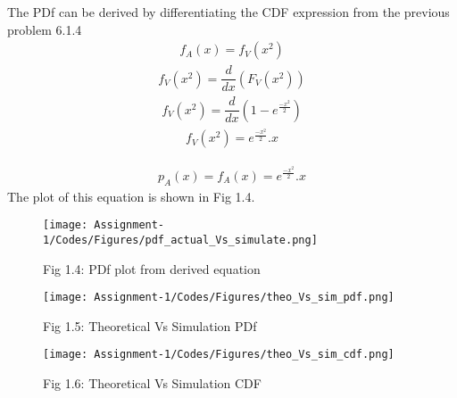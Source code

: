 The PDf can be derived by differentiating the CDF expression from the previous problem 6.1.4
\begin{align}f_A(x) = f_V(x^2)\end{align}
\begin{align}f_V(x^2) = \dfrac{d}{dx}(F_V(x^2))\end{align}
\begin{align}f_V(x^2) = \dfrac{d}{dx}(1 - e^\frac{-x^2}{2})\end{align}
\begin{align}f_V(x^2) = e^\frac{-x^2}{2}.x\end{align}
\begin{mdframed}
\begin{align*}p_A(x) = f_A(x) = e^\frac{-x^2}{2}.x\end{align*}
The plot of this equation is shown in Fig 1.4.
\end{mdframed}
\begin{figure}[h!]
    \centering
    \texttt{[image: Assignment-1/Codes/Figures/pdf\_actual\_Vs\_simulate.png]}
    \caption*{Fig 1.4: PDf plot from derived equation}
\end{figure}
\newpage
{}
\newline 
{}

\begin{figure}[h!]
    \texttt{[image: Assignment-1/Codes/Figures/theo\_Vs\_sim\_pdf.png]}
    \caption*{Fig 1.5: Theoretical Vs Simulation PDf}
\end{figure}
\begin{figure}[h!]
    \texttt{[image: Assignment-1/Codes/Figures/theo\_Vs\_sim\_cdf.png]}
    \caption*{Fig 1.6: Theoretical Vs Simulation CDF}
\end{figure}

